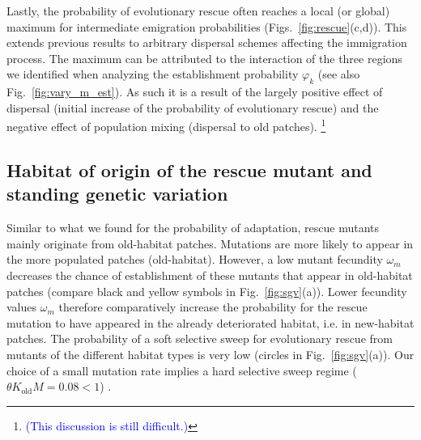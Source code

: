 \documentclass[a4paper,11pt]{article}
\newcommand{\francois}[1]{\textcolor{blue}{(#1)}}
\newcommand{\chg}[1]{\textcolor{change}{#1}}
\begin{document}
Lastly, the probability of evolutionary rescue often reaches a local (or global) maximum for intermediate emigration probabilities (Figs.~\ref{fig:rescue}(c,d)). This extends previous results \citep{uecker_2014,tomasini_2019} to arbitrary dispersal schemes affecting the immigration process. The maximum can be attributed to the interaction of the three regions we identified when analyzing the establishment probability $\varphi_k$ (see also Fig.~\ref{fig:vary_m_est}). As such it is a result of the largely positive effect of dispersal (initial increase of the probability of evolutionary rescue) and the negative effect of population mixing \chg{(dispersal to old patches)}. \footnote{\francois{This discussion is still difficult.}}

\subsection*{Habitat of origin of the rescue mutant and standing genetic variation}
Similar to what \chg{we} found for the probability of adaptation, rescue mutants mainly originate from old-habitat patches. Mutations are more likely to appear in the more populated patches (old-habitat). However, a low mutant fecundity $\omega_m$ decreases the chance of establishment of these mutants that appear in old-habitat patches (compare black and yellow symbols in Fig.~\ref{fig:sgv}(a)). Lower fecundity values $\omega_m$ therefore comparatively increase the probability for the rescue mutation to have appeared in the already deteriorated habitat, i.e. in new-habitat patches. \chg{The probability of a soft selective sweep for evolutionary rescue from mutants of the different habitat types is very low (circles in Fig.~\ref{fig:sgv}(a)). Our choice of a small mutation rate implies a hard selective sweep regime ($\theta K_{\text{old}} M = 0.08<1$) \citep{wilson_2018,hermisson_2017}. }
\end{document}
